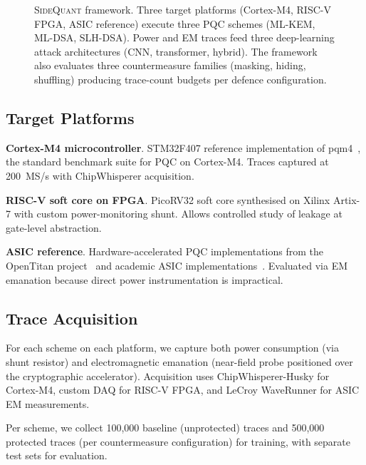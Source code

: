 \documentclass[sigconf,nonacm]{acmart}
\begin{document}
\begin{figure}[t]
\caption{\textsc{SideQuant} framework. Three target platforms (Cortex-M4,
  RISC-V FPGA, ASIC reference) execute three PQC schemes (ML-KEM,
  ML-DSA, SLH-DSA). Power and EM traces feed three deep-learning attack
  architectures (CNN, transformer, hybrid). The framework also evaluates
  three countermeasure families (masking, hiding, shuffling) producing
  trace-count budgets per defence configuration.}
\label{fig:framework}
\end{figure}

\subsection{Target Platforms}

\textbf{Cortex-M4 microcontroller}. STM32F407 reference implementation
of pqm4~\cite{kannwischer2024pqm4}, the standard benchmark suite for
PQC on Cortex-M4. Traces captured at 200~MS/s with ChipWhisperer
acquisition.

\textbf{RISC-V soft core on FPGA}. PicoRV32 soft core synthesised on
Xilinx Artix-7 with custom power-monitoring shunt. Allows controlled
study of leakage at gate-level abstraction.

\textbf{ASIC reference}. Hardware-accelerated PQC implementations from
the OpenTitan project~\cite{opentitan2024} and academic ASIC
implementations~\cite{aikata2024asic}. Evaluated via EM emanation
because direct power instrumentation is impractical.

\subsection{Trace Acquisition}

For each scheme on each platform, we capture both power consumption
(via shunt resistor) and electromagnetic emanation (near-field probe
positioned over the cryptographic accelerator). Acquisition uses
ChipWhisperer-Husky for Cortex-M4, custom DAQ for RISC-V FPGA, and
LeCroy WaveRunner for ASIC EM measurements.

Per scheme, we collect 100{,}000 baseline (unprotected) traces and
500{,}000 protected traces (per countermeasure configuration) for
training, with separate test sets for evaluation.
\end{document}

